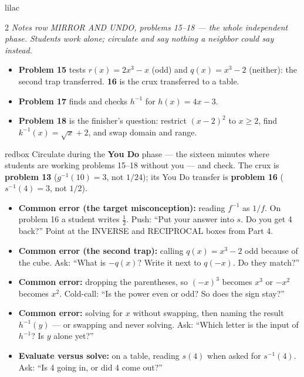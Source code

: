 \documentclass[10pt]{article}
\begin{document}
\begin{skillbox}{lilac}
\begin{multicols}{2}
\textit{Notes row MIRROR AND UNDO, problems 15--18 --- the whole independent phase. Students
work alone; circulate and say nothing a neighbor could say instead.}
\begin{itemize}
  \item \textbf{Problem 15} tests $r(x) = 2x^3 - x$ (odd) and $q(x) = x^3 - 2$ (neither): the
        second trap transferred. \textbf{16} is the crux transferred to a table.
  \item \textbf{Problem 17} finds and checks $h^{-1}$ for $h(x) = 4x - 3$.
  \item \textbf{Problem 18} is the finisher's question: restrict $(x - 2)^2$ to $x \ge 2$, find
        $k^{-1}(x) = \sqrt{x} + 2$, and swap domain and range.
\end{itemize}
\end{multicols}
\end{skillbox}

\begin{skillbox}{redbox}
Circulate during the \textbf{You Do} phase --- the sixteen minutes where students are working
problems 15--18 without you --- and check. The crux is \textbf{problem 13} ($g^{-1}(10) = 3$,
not $1/24$); its You Do transfer is \textbf{problem 16} ($s^{-1}(4) = 3$, not $1/2$).
\begin{itemize}
  \item \textbf{Common error (the target misconception):} reading $f^{-1}$ as $1/f$. On
        problem 16 a student writes $\tfrac{1}{2}$. Push: ``Put your answer into $s$. Do you
        get 4 back?'' Point at the INVERSE and RECIPROCAL boxes from Part 4.
  \item \textbf{Common error (the second trap):} calling $q(x) = x^3 - 2$ odd because of the
        cube. Ask: ``What is $-q(x)$? Write it next to $q(-x)$. Do they match?''
  \item \textbf{Common error:} dropping the parentheses, so $(-x)^3$ becomes $x^3$ or
        $-x^2$ becomes $x^2$. Cold-call: ``Is the power even or odd? So does the sign stay?''
  \item \textbf{Common error:} solving for $x$ without swapping, then naming the result
        $h^{-1}(y)$ --- or swapping and never solving. Ask: ``Which letter is the input of
        $h^{-1}$? Is $y$ alone yet?''
  \item \textbf{Evaluate versus solve:} on a table, reading $s(4)$ when asked for $s^{-1}(4)$.
        Ask: ``Is 4 going in, or did 4 come out?''
\end{itemize}
\end{skillbox}
\end{document}
